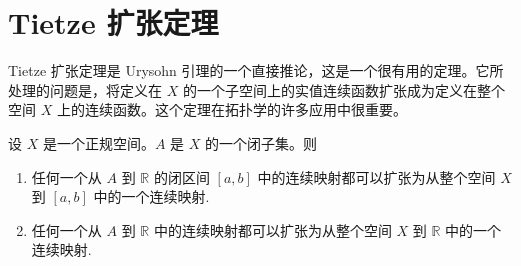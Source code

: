 \section{Tietze 扩张定理}\label{section:ch04-tietze-extension}

Tietze 扩张定理是 Urysohn 引理的一个直接推论，这是一个很有用的定理。它所处理的问题是，将定义在 $X$ 的一个子空间上的实值连续函数扩张成为定义在整个空间 $X$ 上的连续函数。这个定理在拓扑学的许多应用中很重要。

\begin{theorem}\label{theorem:ch04-tietze-extension}
设 $X$ 是一个正规空间。$A$ 是 $X$ 的一个闭子集。则
\begin{enumerate}
\item 任何一个从 $A$ 到 $\mathbb{R}$ 的闭区间 $[a,b]$ 中的连续映射都可以扩张为从整个空间 $X$ 到 $[a,b]$ 中的一个连续映射.
\item 任何一个从 $A$ 到 $\mathbb{R}$ 中的连续映射都可以扩张为从整个空间 $X$ 到 $\mathbb{R}$ 中的一个连续映射.
\end{enumerate}
\end{theorem}

